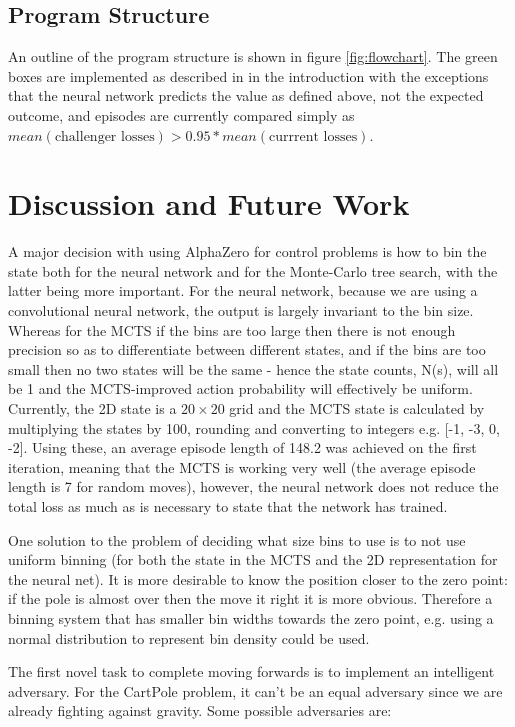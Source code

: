 \documentclass[11.7pt]{article}
\begin{document}
\subsection{Program Structure}

An outline of the program structure is shown in figure \ref{fig:flowchart}. The green boxes are implemented as described in \cite{AlphaGoZero} in the introduction with the exceptions that the neural network predicts the value as defined above, not the expected outcome, and episodes are currently compared simply as $mean(\text{challenger losses}) > 0.95*mean(\text{currrent losses})$.

\section{Discussion and Future Work}

A major decision with using AlphaZero for control problems is how to bin the state both for the neural network and for the Monte-Carlo tree search, with the latter being more important. For the neural network, because we are using a convolutional neural network, the output is largely invariant to the bin size. Whereas for the MCTS if the bins are too large then there is not enough precision so as to differentiate between different states, and if the bins are too small then no two states will be the same - hence the state counts, N(s), will all be 1 and the MCTS-improved action probability will effectively be uniform. Currently, the 2D state is a $20\times20$ grid and the MCTS state is calculated by multiplying the states by 100, rounding and converting to integers e.g. [-1, -3, 0, -2]. Using these, an average episode length of 148.2 was achieved on the first iteration, meaning that the MCTS is working very well (the average episode length is 7 for random moves), however, the neural network does not reduce the total loss as much as is necessary to state that the network has trained. 

One solution to the problem of deciding what size bins to use is to not use uniform binning (for both the state in the MCTS and the 2D representation for the neural net). It is more desirable to know the position closer to the zero point: if the pole is almost over then the move it right it is more obvious. Therefore a binning system that has smaller bin widths towards the zero point, e.g. using a normal distribution to represent bin density could be used.

The first novel task to complete moving forwards is to implement an intelligent adversary. For the CartPole problem, it can’t be an equal adversary since we are already fighting against gravity. Some possible adversaries are: 
\end{document}

